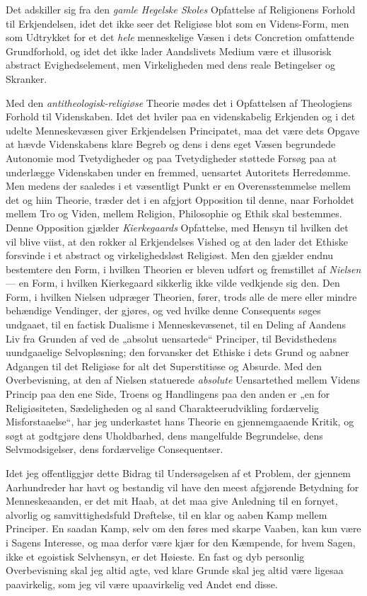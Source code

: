 \documentclass[12pt,a4paper]{book}
\newcommand{\opage}[1]{\marginnote{\footnotesize\textit{[#1]}}}
\begin{document}
Det adskiller sig fra den \emph{gamle Hegelske Skoles} Opfattelse af
Religionens Forhold til Erkjendelsen, idet det ikke seer det Religiøse
blot som en Videns-Form, men som Udtrykket for et det \emph{hele} menneskelige
Væsen i dets Concretion omfattende Grundforhold, og idet det ikke
lader Aandslivets Medium være et illusorisk abstract Evighedselement,
men Virkeligheden med dens reale Betingelser og Skranker.

Med den \emph{antitheologisk-religiøse} Theorie mødes det i Opfattelsen af
Theologiens Forhold til Videnskaben. Idet det hviler paa en
videnskabelig Erkjenden og i det udelte Menneskevæsen giver Erkjendelsen
Principatet, maa det være dets Opgave at hævde Videnskabens klare
Begreb og dens i dens eget Væsen begrundede Autonomie mod
Tvetydigheder og paa Tvetydigheder støttede Forsøg paa at underlægge
Videnskaben under en fremmed, uensartet Autoritets Herredømme. Men
medens der saaledes i et væsentligt Punkt er en Overensstemmelse
mellem det og hiin Theorie, træder det i en afgjort Opposition til
denne, naar Forholdet mellem Tro og Viden, mellem Religion, Philosophie
og Ethik skal bestemmes. Denne Opposition gjælder \emph{Kierkegaards}
Opfattelse, med Hensyn til hvilken det vil blive viist, at den rokker
al Erkjendelses Vished og at den lader det Ethiske forsvinde i et
abstract og virkelighedsløst Religiøst. Men den gjælder endnu
bestemtere den Form, i hvilken Theorien er bleven udført og fremstillet
af \emph{Nielsen} --- en Form, i hvilken Kierkegaard sikkerlig ikke vilde
vedkjende sig den. Den Form, i hvilken Nielsen udpræger Theorien,
fører, trods alle de mere eller mindre behændige Vendinger, der gjøres,
og ved hvilke denne Consequents søges undgaaet, til en factisk Dualisme
i Menneske\opage{7}væsenet, til en Deling af Aandens Liv fra Grunden af ved de
„absolut uensartede“ Principer, til Bevidsthedens uundgaaelige
Selvopløsning; den forvansker det Ethiske i dets Grund og aabner
Adgangen til det Religiøse for alt det Superstitiøse og Absurde. Med
den Overbevisning, at den af Nielsen statuerede \emph{absolute} Uensartethed
mellem Videns Princip paa den ene Side, Troens og Handlingens paa den
anden er „en for Religiøsiteten, Sædeligheden og al sand
Charakteerudvikling fordærvelig Misforstaaelse“, har jeg underkastet
hans Theorie en gjennemgaaende Kritik, og søgt at godtgjøre dens
Uholdbarhed, dens mangelfulde Begrundelse, dens Selvmodsigelser, dens
fordærvelige Consequentser.

Idet jeg offentliggjør dette Bidrag til Undersøgelsen af et Problem,
der gjennem Aarhundreder har havt og bestandig vil have den meest
afgjørende Betydning for Menneskeaanden, er det mit Haab, at det maa
give Anledning til en fornyet, alvorlig og samvittighedsfuld Drøftelse,
til en klar og aaben Kamp mellem Principer. En saadan Kamp, selv om
den føres med skarpe Vaaben, kan kun være i Sagens Interesse, og maa derfor være kjær for den Kæmpende, for hvem Sagen, ikke et
egoistisk Selvhensyn, er det Høieste. En fast og dyb personlig
Overbevisning skal jeg altid agte, ved klare Grunde skal jeg altid være
ligesaa paavirkelig, som jeg vil være upaavirkelig ved Andet end
disse.
\end{document}
